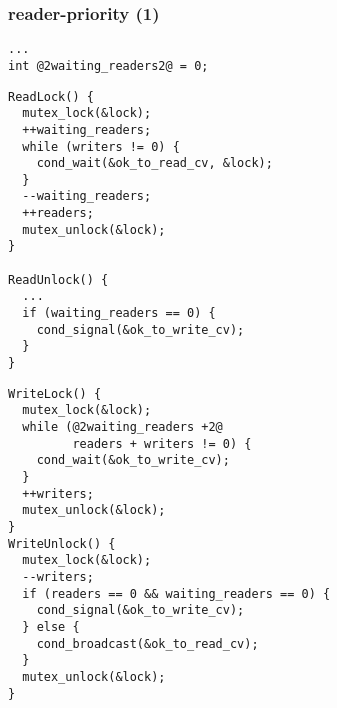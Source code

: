 

\begin{frame}[fragile,label=readerPriority]\frametitle{reader-priority (1)}
\begin{lstlisting}
...
int @2waiting_readers2@ = 0;
\end{lstlisting}
\vspace{-.3cm}
\begin{minipage}{0.45\textwidth}
\begin{lstlisting}
ReadLock() {
  mutex_lock(&lock);
  ++waiting_readers;
  while (writers != 0) {
    cond_wait(&ok_to_read_cv, &lock);
  }
  --waiting_readers;
  ++readers;
  mutex_unlock(&lock);
}

ReadUnlock() {
  ...
  if (waiting_readers == 0) {
    cond_signal(&ok_to_write_cv);
  }
}
\end{lstlisting}
\end{minipage}
\begin{minipage}{0.45\textwidth}
\begin{lstlisting}
WriteLock() {
  mutex_lock(&lock);
  while (@2waiting_readers +2@
         readers + writers != 0) {
    cond_wait(&ok_to_write_cv);
  }
  ++writers;
  mutex_unlock(&lock);
}
WriteUnlock() {
  mutex_lock(&lock);
  --writers;
  if (readers == 0 && waiting_readers == 0) {
    cond_signal(&ok_to_write_cv);
  } else {
    cond_broadcast(&ok_to_read_cv);
  }
  mutex_unlock(&lock);
}
\end{lstlisting}
\end{minipage}
\end{frame}

